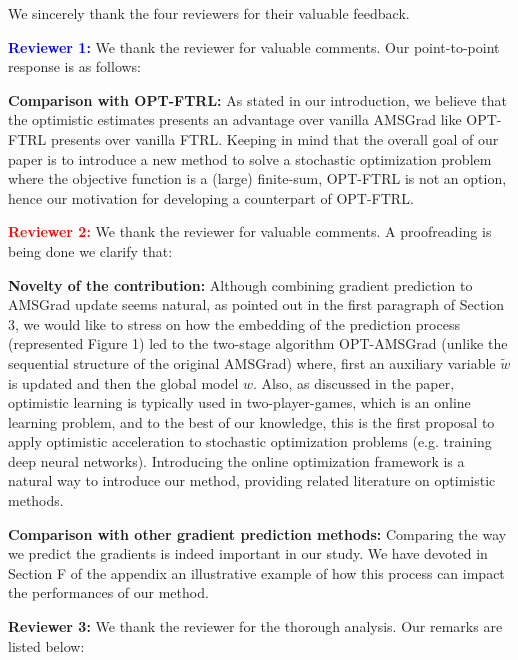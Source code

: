 \documentclass{article}
\begin{document}
We sincerely thank the four reviewers for their valuable feedback. 

\vspace{0.02in}

\textbf{\textcolor{blue}{Reviewer 1:}} We thank the reviewer for valuable comments. Our point-to-point response is as follows:\vspace{-5pt}


\textbf{Comparison with OPT-FTRL:} As stated in our introduction, we believe that the optimistic estimates presents an advantage over vanilla AMSGrad like OPT-FTRL presents over vanilla FTRL.
Keeping in mind that the overall goal of our paper is to introduce a new method to solve a stochastic optimization problem where the objective function is a (large) finite-sum, OPT-FTRL is not an option, hence our motivation for developing a counterpart of OPT-FTRL.

\vspace{0.02in}


\textbf{\textcolor{red}{Reviewer 2:}} We thank the reviewer for valuable comments. A proofreading is being done we clarify that:\vspace{-5pt}

\textbf{Novelty of the contribution:} 
Although combining gradient prediction to AMSGrad update seems natural, as pointed out in the first paragraph of Section 3, we would like to stress on how the embedding of the prediction process (represented Figure 1) led to the two-stage algorithm OPT-AMSGrad (unlike the sequential structure of the original AMSGrad) where, first an auxiliary variable $\tilde{w}$ is updated and then the global model $w$. 
Also, as discussed in the paper, optimistic learning is typically used in two-player-games, which is an online learning problem, and to the best of our knowledge, this is the first proposal to apply optimistic acceleration to stochastic optimization problems (e.g. training deep neural networks). 
Introducing the online optimization framework is a natural way to introduce our method, providing related literature on optimistic methods.\vspace{-5pt}

\textbf{Comparison with other gradient prediction methods:} Comparing the way we predict the gradients is indeed important in our study. We have devoted in Section F of the appendix an illustrative example of how this process can impact the performances of our method. 

\vspace{0.02in}
\textbf{\textcolor{green!50!black}{Reviewer 3:}} We thank the reviewer for the thorough analysis. Our remarks are listed below:\vspace{-5pt}
\end{document}
